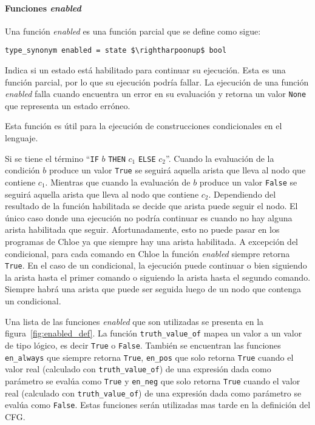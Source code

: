 \paragraph*{Funciones \textit{enabled}}\label{paragraph:enabled}

Una función \textit{enabled} es una función parcial que se define como sigue:

\begin{lstlisting}[mathescape=true, frame=single]
type_synonym enabled = state $\rightharpoonup$ bool
\end{lstlisting}

Indica si un estado está habilitado para continuar su ejecución.
Esta es una función parcial, por lo que su ejecución podría fallar.
La ejecución de una función \textit{enabled} falla cuando encuentra un error en su evaluación y retorna un valor \verb|None| que representa un estado erróneo.

Esta función es útil para la ejecución de construcciones condicionales en el lenguaje.

Si se tiene el término ``\verb|IF| $b$ \verb|THEN| $c_{1}$ \verb|ELSE| $c_{2}$''.
Cuando la evaluación de la condición $b$ produce un valor \verb|True| se seguirá aquella arista que lleva al nodo que contiene $c_1$.
Mientras que cuando la evaluación de $b$ produce un valor \verb|False| se seguirá aquella arista que lleva al nodo que contiene $c_2$.
Dependiendo del resultado de la función habilitada se decide que arista puede seguir el nodo.
El único caso donde una ejecución no podría continuar es cuando no hay alguna arista habilitada que seguir.
Afortunadamente, esto no puede pasar en los programas de Chloe ya que siempre hay una arista habilitada.
A excepción del condicional, para cada comando en Chloe la función \textit{enabled} siempre retorna \verb|True|.
En el caso de un condicional, la ejecución puede continuar o bien siguiendo la arista hasta el primer comando o siguiendo la arista hasta el segundo comando.
Siempre habrá una arista que puede ser seguida luego de un nodo que contenga un condicional.

Una lista de las funciones \textit{enabled} que son utilizadas se presenta en la figura~\ref{fig:enabled_def}.
La función \verb|truth_value_of| mapea un valor a un valor de tipo lógico, es decir \verb|True| o \verb|False|.
También se encuentran las funciones \verb|en_always| que siempre retorna \verb|True|, \verb|en_pos| que solo retorna \verb|True| cuando el valor real (calculado con \verb|truth_value_of|) de una expresión dada como parámetro se evalúa como \verb|True| y \verb|en_neg| que solo retorna \verb|True| cuando el valor real (calculado con \verb|truth_value_of|) de una expresión dada como parámetro se evalúa como \verb|False|.
Estas funciones serán utilizadas mas tarde en la definición del CFG.

